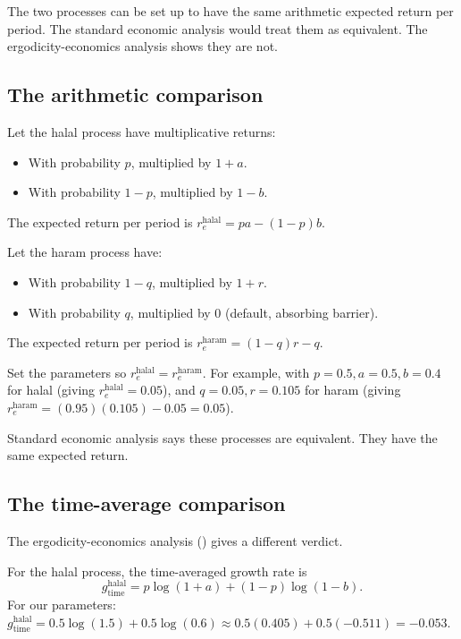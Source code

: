 The two processes can be set up to have the same arithmetic expected
return per period. The standard economic analysis would treat them
as equivalent. The ergodicity-economics analysis shows they are
not.

\subsection{The arithmetic comparison}

Let the halal process have multiplicative returns:

\begin{itemize}[leftmargin=2em]
    \item With probability $p$, multiplied by $1 + a$.
    \item With probability $1 - p$, multiplied by $1 - b$.
\end{itemize}

The expected return per period is $r_e^{\text{halal}} = pa - (1-p)b$.

Let the haram process have:

\begin{itemize}[leftmargin=2em]
    \item With probability $1 - q$, multiplied by $1 + r$.
    \item With probability $q$, multiplied by 0 (default,
    absorbing barrier).
\end{itemize}

The expected return per period is $r_e^{\text{haram}} = (1-q)r - q$.

Set the parameters so $r_e^{\text{halal}} = r_e^{\text{haram}}$.
For example, with $p = 0.5, a = 0.5, b = 0.4$ for halal (giving
$r_e^{\text{halal}} = 0.05$), and $q = 0.05, r = 0.105$ for haram
(giving $r_e^{\text{haram}} = (0.95)(0.105) - 0.05 = 0.05$).

Standard economic analysis says these processes are equivalent.
They have the same expected return.

\subsection{The time-average comparison}

The ergodicity-economics analysis ()
gives a different verdict.

For the halal process, the time-averaged growth rate is
\[
    g_{\text{time}}^{\text{halal}} = p \log(1 + a) + (1 - p) \log(1 - b).
\]
For our parameters: $g_{\text{time}}^{\text{halal}} = 0.5 \log(1.5)
+ 0.5 \log(0.6) \approx 0.5 (0.405) + 0.5 (-0.511) = -0.053$.

